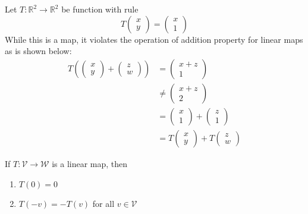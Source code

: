 \begin{exm}
	Let $T:\mathbb{R}^2\to\mathbb{R}^2$ be function with rule
	\begin{equation*}
		T\begin{pmatrix}
			x \\ y
		\end{pmatrix}=\begin{pmatrix}
			x \\ 1
		\end{pmatrix}
	\end{equation*}
	While this is a map, it violates the operation of addition property for linear
	maps as is shown below:
	\begin{align*}
		T\left(\begin{pmatrix}
			x \\ y
		\end{pmatrix} + \begin{pmatrix}
			z \\ w
		\end{pmatrix}\right)
		 & = \begin{pmatrix}
			x + z \\ 1
		\end{pmatrix}                               \\
		 & \neq \begin{pmatrix}
			x + z \\ 2
		\end{pmatrix}                            \\
		 & =\begin{pmatrix}
			x \\ 1
		\end{pmatrix} +
		\begin{pmatrix}
			z \\ 1
		\end{pmatrix}                                    \\
		 & =T\begin{pmatrix}
			x \\ y
		\end{pmatrix} + T\begin{pmatrix}
			z \\ w
		\end{pmatrix}
	\end{align*}
\end{exm}

\begin{thm}\label{thm-linear-map-properties}
	If $T:\mathcal{V}\to\mathcal{W}$ is a linear map, then
	\begin{enumerate}
		\item $T(0)=0$
		\item $T(-v)=-T(v)$ for all $v\in\mathcal{V}$
	\end{enumerate}
\end{thm}

